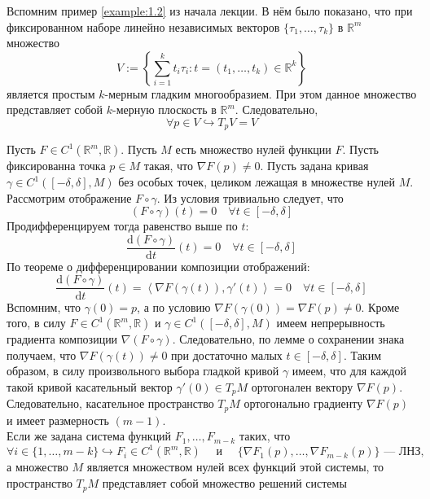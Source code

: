\documentclass[11pt]{article}
\begin{document}
\begin{remark}
    Вспомним пример \ref{example:1.2} из начала лекции. В нём было показано, что при фиксированном наборе линейно независимых векторов $\{\tau_1, \ldots, \tau_k\}$ в $\mathbb{R}^m$ множество
    \[V := \left\{\sum_{i = 1}^k t_i \tau_i: t = (t_1, \ldots, t_k) \in \mathbb{R}^k\right\}\]
    является простым $k$-мерным гладким многообразием. При этом данное множество представляет собой $k$-мерную плоскость в $\mathbb{R}^m$. Следовательно,
    \[\forall p \in V \hookrightarrow T_p V = V\]
\end{remark}


\begin{example}
    Пусть $F\in C^1(\mathbb{R}^m, \mathbb{R})$. Пусть $M$ есть множество нулей функции $F$.
    Пусть фиксированна точка $p\in M$ такая, что $ \nabla F(p)\neq 0$. Пусть задана кривая $\gamma \in C^{1}([-\delta, \delta], M)$ без особых точек, целиком лежащая в множестве нулей $M$.
    Рассмотрим отображение $F \circ \gamma$. Из условия тривиально следует, что
    \[ (F\circ \gamma)(t) =0 \quad \forall t\in [-\delta,\delta] \] 
    Продифференцируем тогда равенство выше по $t$: 
    \[\frac{\mathrm{d}(F\circ \gamma)}{\mathrm{d}t} (t) = 0 \quad \forall t\in [-\delta,\delta] \]
    По теореме о дифференцировании композиции отображений:
    \[ \frac{\mathrm{d}(F\circ \gamma)}{\mathrm{d}t} (t) = \left\langle \nabla F(\gamma(t)), \gamma'(t) \right\rangle  = 0 \quad \forall t \in [-\delta, \delta]\]
    Вспомним, что $\gamma(0) = p$, а по условию $\nabla F(\gamma(0)) = \nabla F(p) \neq 0$. Кроме того, в силу $F \in C^{1}(\mathbb{R}^m, \mathbb{R})$ и $\gamma \in C^{1}([-\delta, \delta], M)$ имеем непрерывность градиента композиции $\nabla (F \circ \gamma)$. Следовательно, по лемме о сохранении знака получаем, что  $\nabla F(\gamma(t)) \neq 0$ при достаточно малых $t \in [-\delta, \delta]$. Таким образом, в силу произвольного выбора гладкой кривой $\gamma$ имеем, что для каждой такой кривой касательный вектор $\gamma'(0) \in T_p M$ ортогонален вектору $\nabla F(p)$. 
    Следовательно, касательное пространство $T_p M$ ортогонально градиенту $\nabla F(p)$ и имеет размерность $(m-1)$.\\
    Если же задана система функций $F_1, \ldots , F_{m-k}$ таких, что
    \[\forall i \in \{1, \ldots, m - k\} \hookrightarrow F_i \in C^{1}(\mathbb{R}^m, \mathbb{R}) \quad \text{ и } \quad \{\nabla F_1(p), \ldots, \nabla F_{m - k}(p)\} \text{ --- ЛНЗ},\]
    а множество $M$ является множеством нулей всех функций этой системы, то пространство $T_p M$ представляет собой множество решений системы

\end{example}
\end{document}
